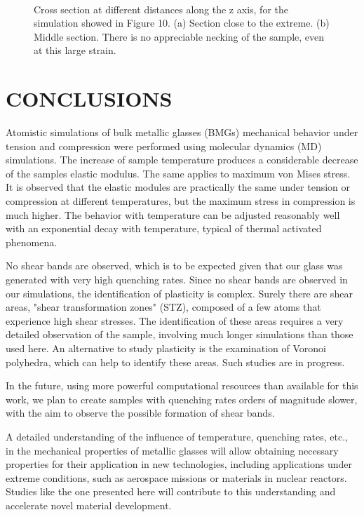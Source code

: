 \begin{figure}[htp]
\centering
{}
\\
\caption{Cross section at different distances along the z axis, for the simulation showed in Figure 10. (a) Section close to the extreme. (b) Middle section. There is no appreciable necking of the sample, even at this large strain.}
\label{C3:fg:cross}
\end{figure}

\section{CONCLUSIONS}
Atomistic simulations of bulk metallic glasses (BMGs) mechanical behavior under tension and compression were performed using molecular dynamics (MD) simulations. The increase of sample temperature produces a considerable decrease of the samples elastic modulus. The same applies to maximum von Mises stress. It is observed that the elastic modules are practically the same under tension or compression at different temperatures, but the maximum stress in compression is much higher. The behavior with temperature can be adjusted reasonably well with an exponential decay with temperature, typical of thermal activated phenomena.

No shear bands are observed, which is to be expected given that our glass was generated with very high quenching rates. Since no shear bands are observed in our simulations, the identification of plasticity is complex. Surely there are shear areas, "shear transformation zones" (STZ), composed of a few atoms that experience high shear stresses. The identification of these areas requires a very detailed observation of the sample, involving much longer simulations than those used here. An alternative to study plasticity is the examination of Voronoi polyhedra, which can help to identify these areas. Such studies are in progress.

In the future, using more powerful computational resources than available for this work, we plan to create samples with quenching rates orders of magnitude slower, with the aim to observe the possible formation of shear bands.

A detailed understanding of the influence of temperature, quenching rates, etc., in the mechanical properties of metallic glasses will allow obtaining necessary properties for their application in new technologies, including applications under extreme conditions, such as aerospace missions or materials in nuclear reactors. Studies like the one presented here will contribute to this understanding and accelerate novel material development. 

